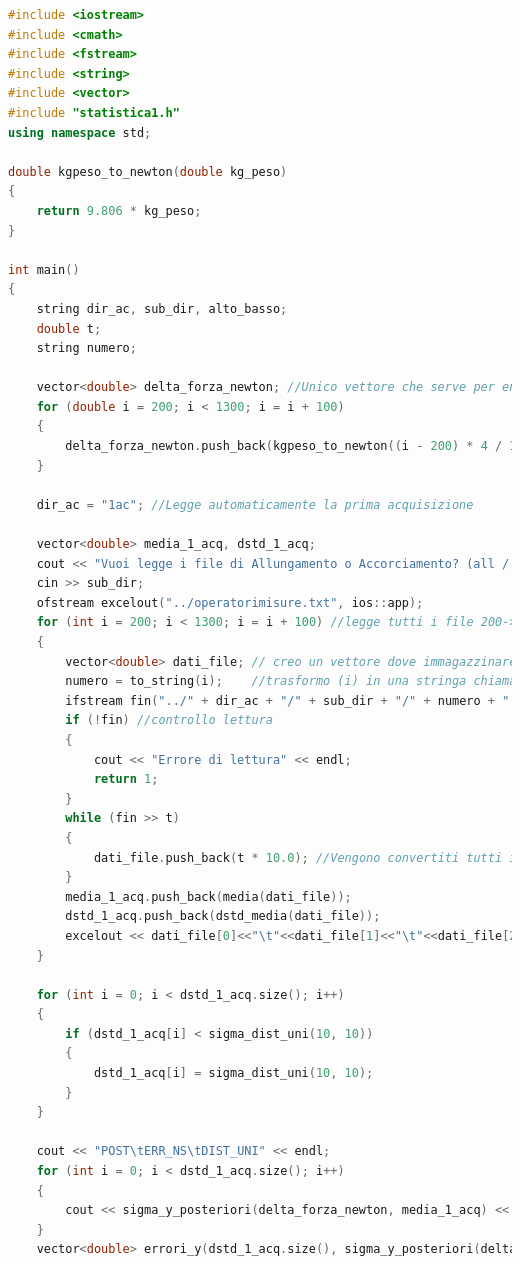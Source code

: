 \documentclass[a4paper,11pt,oneside]{article}
\begin{document}
\begin{lstlisting}[language=C++, label=lst:analisi_1ac, caption=analisi\_1ac]
#include <iostream>
#include <cmath>
#include <fstream>
#include <string>
#include <vector>
#include "statistica1.h"
using namespace std;

double kgpeso_to_newton(double kg_peso)
{
    return 9.806 * kg_peso;
}

int main()
{
    string dir_ac, sub_dir, alto_basso;
    double t;
    string numero;

    vector<double> delta_forza_newton; //Unico vettore che serve per entrambe le esperienze
    for (double i = 200; i < 1300; i = i + 100)
    {
        delta_forza_newton.push_back(kgpeso_to_newton((i - 200) * 4 / 1000)); //Delta_F per l'asse x
    }

    dir_ac = "1ac"; //Legge automaticamente la prima acquisizione

    vector<double> media_1_acq, dstd_1_acq;
    cout << "Vuoi legge i file di Allungamento o Accorciamento? (all / acc): ";
    cin >> sub_dir;
    ofstream excelout("../operatorimisure.txt", ios::app);
    for (int i = 200; i < 1300; i = i + 100) //legge tutti i file 200->1200
    {
        vector<double> dati_file; // creo un vettore dove immagazzinare i 3 dati per ogni foglio e faccio fare la media con libreria
        numero = to_string(i);    //trasformo (i) in una stringa chiamata numero
        ifstream fin("../" + dir_ac + "/" + sub_dir + "/" + numero + ".txt");
        if (!fin) //controllo lettura
        {
            cout << "Errore di lettura" << endl;
            return 1;
        }
        while (fin >> t)
        {
            dati_file.push_back(t * 10.0); //Vengono convertiti tutti in micron. I dati sono letti come 1e-5m
        }
        media_1_acq.push_back(media(dati_file));
        dstd_1_acq.push_back(dstd_media(dati_file));
        excelout << dati_file[0]<<"\t"<<dati_file[1]<<"\t"<<dati_file[2]<<"\t"<<media(dati_file) << "\t" << dstd(dati_file) << "\t" << dstd_media(dati_file) << endl;
    }

    for (int i = 0; i < dstd_1_acq.size(); i++)
    {
        if (dstd_1_acq[i] < sigma_dist_uni(10, 10))
        {
            dstd_1_acq[i] = sigma_dist_uni(10, 10);
        }
    }

    cout << "POST\tERR_NS\tDIST_UNI" << endl;
    for (int i = 0; i < dstd_1_acq.size(); i++)
    {
        cout << sigma_y_posteriori(delta_forza_newton, media_1_acq) << "\t" << dstd_1_acq[i] << endl;
    }
    vector<double> errori_y(dstd_1_acq.size(), sigma_y_posteriori(delta_forza_newton, media_1_acq));


\end{lstlisting}
\end{document}
